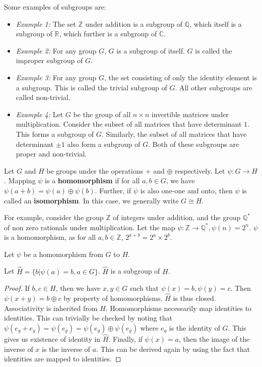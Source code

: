 Some examples of subgroups are:
\begin{itemize}
  \item \emph{Example 1:} The set $\mathbb{Z}$ under addition is a subgroup of $\mathbb{Q}$, which itself is a subgroup of $\mathbb{R}$, which further is a subgroup of $\mathbb{C}$.
  \item \emph{Example 2:} For any group $G$, $G$ is a subgroup of itself.
    $G$ is called the improper subgroup of $G$.
  \item \emph{Example 3:} For any group $G$, the set consisting of only the identity element is a subgroup.
    This is called the trivial subgroup of $G$.
    All other subgroups are called non-trivial.
  \item \emph{Example 4:} Let $G$ be the group of all $n \times n$ invertible matrices under multiplication.
    Consider the subset of all matrices that have determinant $1$.
    This forms a subgroup of $G$.
    Similarly, the subset of all matrices that have determinant $\pm 1$ also form a subgroup of $G$.
    Both of these subgroups are proper and non-trivial.
\end{itemize}

\begin{definition} \label{def:homomorphism}
  Let $G$ and $H$ be groups under the operations $+$ and $\oplus$ respectively.
  Let $\psi: G \rightarrow H$. Mapping $\psi$ is a \textbf{homomorphism} if for all $a, b \in G$, we have $\psi(a + b) = \psi(a) \oplus \psi(b)$.
  Further, if $\psi$ is also one-one and onto, then $\psi$ is called an \textbf{isomorphism}.
  In this case, we generally write $G \cong H$.
\end{definition}
For example, consider the group $\mathbb{Z}$ of integers under addition, and the group $\mathbb{Q}^{*}$ of non zero rationals under multiplication.
Let the map $\psi: \mathbb{Z} \rightarrow \mathbb{Q}^{*}, \psi(n) = 2^{n}$.
$\psi$ is a homomorphism, as for all $a, b \in \mathbb{Z}$, $2^{a+b} = 2^{a} \times 2^{b}$.
\par
Let $\psi$ be a homomorphism from $G$ to $H$.
\begin{lemma} \label{lem:imagesubgroup}
  Let $\widehat{H} = \{b | \psi(a) = b, a \in G\}$.
  $\widehat{H}$ is a subgroup of $H$.
\end{lemma}
\begin{proof}
  If $b, c \in H$, then we have $x, y \in G$ such that $\psi(x) = b, \psi(y) = c$.
  Then $\psi( x + y) = b \oplus c$ by property of homomorphisms.
  $\widehat{H}$ is thus closed.
  Associativity is inherited from $H$.
  Homomorphisms necessarily map identities to identities.
  This can trivially be checked by noting that $\psi(e_{g} + e_{g}) = \psi(e_{g}) = \psi(e_{g}) \oplus \psi(e_{g})$ where $e_{g}$ is the identity of $G$.
  This gives us existence of identity in $\widehat{H}$.
  Finally, if $\psi(x) = a$, then the image of the inverse of $x$ is the inverse of $a$.
  This can be derived again by using the fact that identities are mapped to identities.
\end{proof}

